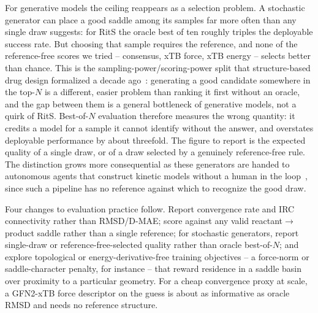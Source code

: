 \documentclass[11pt]{article}
\begin{document}
For generative models the ceiling reappears as a selection problem.
A stochastic generator can place a good saddle among its samples far more often
than any single draw suggests: for RitS the oracle best of ten roughly triples
the deployable success rate. But choosing that sample requires the reference, and
none of the reference-free scores we tried -- consensus, xTB force, xTB energy --
selects better than chance. This is the sampling-power/scoring-power split that
structure-based drug design formalized a decade ago~\cite{Wang2016,CASF2016}:
generating a good candidate somewhere in the top-$N$ is a different, easier problem
than ranking it first without an oracle, and the gap between them is a general
bottleneck of generative models, not a quirk of RitS. Best-of-$N$ evaluation
therefore measures the wrong quantity: it credits a model for a sample it cannot
identify without the answer, and overstates deployable performance by about
threefold. The figure to report is the expected quality of a single draw, or
of a draw selected by a genuinely reference-free rule. The distinction grows more
consequential as these generators are handed to autonomous agents that construct
kinetic models without a human in the loop~\cite{GrinbergDana2026b}, since such a
pipeline has no reference against which to recognize the good draw.

Four changes to evaluation practice follow. Report convergence rate and IRC
connectivity rather than
RMSD/D-MAE; score against any valid reactant$\rightarrow$product
saddle rather than a single reference; for stochastic generators, report
single-draw or reference-free-selected quality rather than oracle best-of-$N$; and
explore topological or energy-derivative-free training objectives -- a force-norm
or saddle-character penalty, for instance -- that reward residence in a
saddle basin over proximity to a particular geometry. For a cheap convergence
proxy at scale, a GFN2-xTB force descriptor on the guess is about as informative
as oracle RMSD and needs no reference structure.
\end{document}
